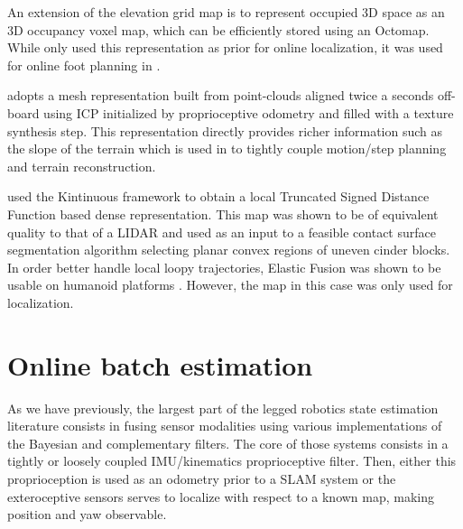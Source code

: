An extension of the elevation grid map is to represent occupied 3D space as an 3D occupancy voxel map, which can be efficiently stored using an Octomap.
While \cite{hornung2014monte, fallon2014drift} only used this representation as prior for online localization, it was used for online foot planning in \cite{winkler2015planning, mastalli2015line}. 

\cite{kolter2009stereo} adopts a mesh representation built from point-clouds aligned twice a seconds off-board using ICP initialized by proprioceptive odometry and filled with
a texture synthesis step. This representation directly provides richer information such as the slope of the terrain which is used in \cite{mastalli2020motion} to 
tightly couple motion/step planning and terrain reconstruction. 

\cite{fallon2015continuous} used the Kintinuous framework to obtain a local Truncated Signed Distance Function based dense representation. This map was
shown to be of equivalent quality to that of a LIDAR and used as an input to a feasible contact surface segmentation algorithm selecting planar convex regions of uneven cinder blocks. 
In order better handle local loopy trajectories, Elastic Fusion was shown to be usable on humanoid platforms \cite{scona2017direct}. 
However, the map in this case was only used for localization.






\section{Online batch estimation}

As we have previously, the largest part of the legged robotics state estimation literature consists in fusing sensor modalities using various 
implementations of the Bayesian and complementary filters. The core of those systems consists in a tightly or loosely coupled IMU/kinematics proprioceptive
filter. Then, either this proprioception is used as an odometry prior to a SLAM system or the exteroceptive sensors serves to localize with respect to a known map,
making position and yaw observable.

